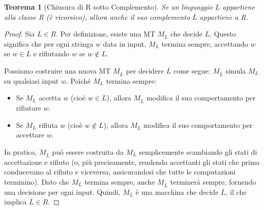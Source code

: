 \documentclass[a4paper, 11pt]{book} %
\newtheorem{theorem}{Teorema}[section]
\theoremstyle{definition}
\begin{document}
\begin{theorem}[Chiusura di R sotto Complemento]
Se un linguaggio $L$ appartiene alla classe R (è ricorsivo), allora anche il suo complemento $\overline{L}$ appartiene a R.
\end{theorem}
\begin{proof}
Sia $L \in R$. Per definizione, esiste una MT $M_L$ che decide $L$. Questo significa che per ogni stringa $w$ data in input, $M_L$ termina sempre, accettando $w$ se $w \in L$ e rifiutando $w$ se $w \notin L$.

Possiamo costruire una nuova MT $M_{\overline{L}}$ per decidere $\overline{L}$ come segue:
$M_{\overline{L}}$ simula $M_L$ su qualsiasi input $w$. Poiché $M_L$ termina sempre:
\begin{itemize}
    \item Se $M_L$ accetta $w$ (cioè $w \in L$), allora $M_{\overline{L}}$ modifica il suo comportamento per rifiutare $w$.
    \item Se $M_L$ rifiuta $w$ (cioè $w \notin L$), allora $M_{\overline{L}}$ modifica il suo comportamento per accettare $w$.
\end{itemize}
In pratica, $M_{\overline{L}}$ può essere costruita da $M_L$ semplicemente scambiando gli stati di accettazione e rifiuto (o, più precisamente, rendendo accettanti gli stati che prima conducevano al rifiuto e viceversa, assicurandosi che tutte le computazioni terminino).
Dato che $M_L$ termina sempre, anche $M_{\overline{L}}$ terminerà sempre, fornendo una decisione per ogni input. Quindi, $M_{\overline{L}}$ è una macchina che decide $\overline{L}$, il che implica $\overline{L} \in R$.
\end{proof}
\end{document}
